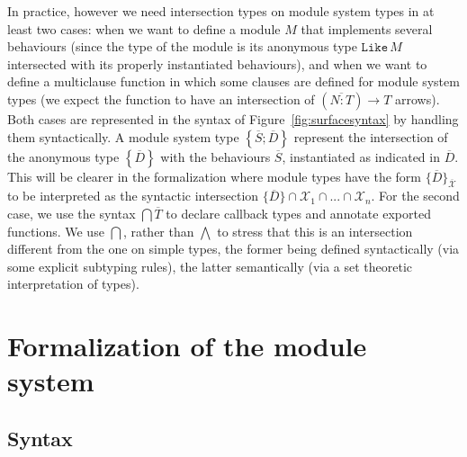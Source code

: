 \documentclass[a4paper,10pt]{article}
\newcommand{\BX}{\ensuremath{\mathcal{X}}}
\begin{document}
  In practice, however we need intersection types on module system types in at least two cases: when we want to define a module $M$ that implements several behaviours (since the type of the module is its anonymous type $\texttt{Like}\,M$ intersected with its properly instantiated behaviours), and when we want to define a multiclause function in which some clauses are defined for module system types (we expect the function to have an intersection of $(\overline{N:T})\to T$ arrows). Both cases are represented in the syntax of Figure~\ref{fig:surfacesyntax} by handling them syntactically. A module system type $\left\{\overline{S};\overline{D}\right\}$ represent the intersection of the anonymous type $\left\{\overline{D}\right\}$ with the behaviours $\overline{S}$, instantiated as indicated in $\overline{D}$. This will be clearer in the formalization where module types have the form $\{\overline{D}\}_{\overline{\BX}}$ to be interpreted as the syntactic intersection $\{\overline D\}\cap{\BX_1}\cap...\cap{\BX_n}$. For the second case, we use the syntax $\bigcap \overline{T}$ to declare callback types and annotate exported functions. We use $\bigcap$, rather than $\bigwedge$ to stress that this is an intersection different from the one on simple types, the former being defined syntactically (via some explicit subtyping rules), the latter semantically (via a set theoretic interpretation of types).

  


\section{Formalization of the module system}

\subsection{Syntax}
\end{document}
